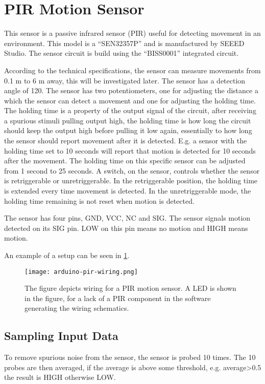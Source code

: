 \section{PIR Motion Sensor}\label{sub:pir}

This sensor is a passive infrared sensor (PIR) useful for detecting movement in an environment. This model is a \enquote{SEN32357P}\cite{datasheet_pir1} and is manufactured by SEEED Studio. The sensor circuit is build using the \enquote{BISS0001}\cite{datasheet_pir2} integrated circuit.

According to the technical specifications, the sensor can measure movements from 0.1 m to 6 m away, this will be investigated later. The sensor has a detection angle of 120\degree. The sensor has two potentiometers, one for adjusting the distance a which the sensor can detect a movement and one for adjusting the holding time. The holding time is a property of the output signal of the circuit, after receiving a spurious stimuli pulling output high, the holding time is how long the circuit should keep the output high before pulling it low again, essentially to how long the sensor should report movement after it is detected. E.g. a sensor with the holding time set to 10 seconds will report that motion is detected for 10 seconds after the movement. The holding time on this specific sensor can be adjusted from 1 second to 25 seconds. A switch, on the sensor, controls whether the sensor is retriggerable or unretriggerable. In the retriggerable position, the holding time is extended every time movement is detected. In the unretriggerable mode, the holding time remaining is not reset when motion is detected.

The sensor has four pins, GND, VCC, NC and SIG. The sensor signals motion detected on its SIG pin. LOW on this pin means no motion and HIGH means motion.

An example of a setup can be seen in \cref{fig:arduino_pir_wiring}.

\begin{figure}[htbp]
  \centering
  \texttt{[image: arduino-pir-wiring.png]}
  \caption[PIR sensor]{The figure depicts wiring for a PIR motion sensor. A LED is shown in
    the figure, for a lack of a PIR component in the software generating the
    wiring schematics.}
  \label{fig:arduino_pir_wiring}
\end{figure}

\subsection{Sampling Input Data}
To remove spurious noise from the sensor, the sensor is probed 10 times. The 10 probes are then averaged, if the average is above some threshold, e.g. average>0.5 the result is HIGH otherwise LOW.
